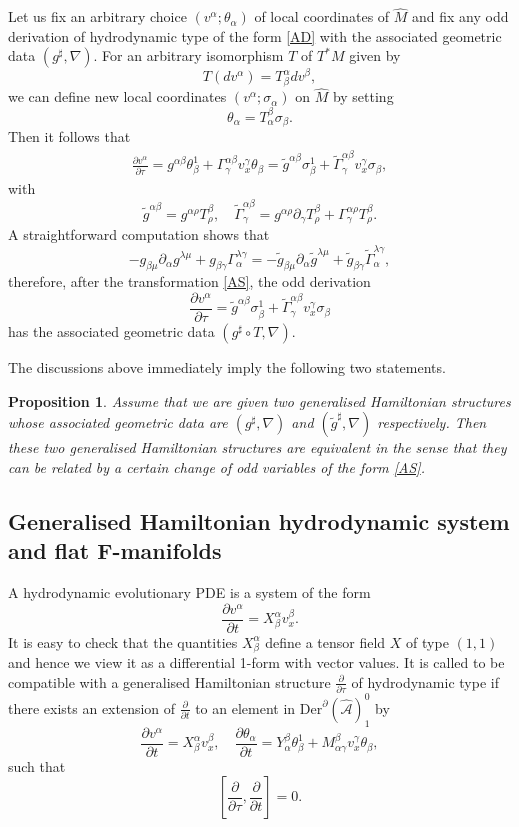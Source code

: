 \documentclass[11pt,a4paper]{amsart}
\numberwithin{equation}{section}
\newtheorem{proposition}[theorem]{Proposition}
\newcommand{\derx}{\mathrm{Der}^{\qp}(\hm A)}
\newcommand{\diff}[2]{\frac{\partial #1}{\partial #2}}
\newcommand{\qa}{\alpha}
\newcommand{\qb}{\beta}
\newcommand{\qg}{\gamma}
\newcommand{\qs}{\sigma}
\newcommand{\qt}{\tau}
\newcommand{\qth}{\theta}
\newcommand{\qp}{\partial}
\newcommand{\Qg}{\Gamma}
\newcommand{\ql}{\lambda}
\newcommand{\hm}[1]{\hat{\mathcal #1}}
\newcommand{\fk}[2]{\left[#1, #2\right]}
\numberwithin{equation}{section}
\begin{document}
Let us fix an arbitrary choice $(v^\qa;\qth_\qa)$ of local coordinates of $\hat M$ and fix any odd derivation of hydrodynamic type of the form \eqref{AD} with the associated geometric data $(g^\sharp,\nabla)$. For an arbitrary isomorphism $T$ of $T^*M$ given by 
\[
T(dv^\qa) = T^\qa_\qb dv^\qb,
\]
we can define new local coordinates $(v^\qa;\qs_\qa)$ on $\hat M$ by setting 
\begin{equation}
  \label{AS}
\qth_\qa = T_\qa^\qb\qs_\qb.
\end{equation}
Then it follows that 
\begin{align*}
  \diff{v^\qa}{\qt} = g^{\qa\qb}\qth_\qb^1+\Qg^{\qa\qb}_\qg v^\qg_x\qth_\qb=\tilde g^{\qa\qb}\qs_\qb^1+\tilde \Qg^{\qa\qb}_\qg v^\qg_x\qs_\qb,
\end{align*}
with
\[
\tilde g^{\qa\qb} = g^{\qa\rho}T^\qb_\rho,\quad \tilde\Qg^{\qa\qb}_\qg = g^{\qa\rho}\qp_\qg T^\qb_\rho+\Qg^{\qa\rho}_\qg T^\qb_\rho.
\]
A straightforward computation shows that 
\[
-g_{\qb\mu}\qp_\qa g^{\ql\mu}+g_{\qb\qg}\Qg^{\ql\qg}_\qa = -\tilde g_{\qb\mu}\qp_\qa \tilde g^{\ql\mu}+\tilde g_{\qb\qg}\tilde \Qg^{\ql\qg}_\qa,
\]
therefore, after the transformation \eqref{AS}, the odd derivation 
\[
\diff{v^\qa}{\qt}=\tilde g^{\qa\qb}\qs_\qb^1+\tilde \Qg^{\qa\qb}_\qg v^\qg_x\qs_\qb
\]
has the associated geometric data $(g^\sharp\circ T,\nabla)$. 

The discussions above immediately imply the following two statements.
\begin{proposition}
  \label{AW}
Assume that  we are given two generalised Hamiltonian structures whose associated geometric data are $(g^\sharp,\nabla)$ and $(\tilde g^\sharp,\nabla)$ respectively. Then these two generalised Hamiltonian structures are equivalent in the sense that they can be related by a certain change of odd variables of the form \eqref{AS}.
\end{proposition}


\subsection{Generalised Hamiltonian hydrodynamic system and flat F-manifolds}
A hydrodynamic evolutionary PDE is a system of the form 
\begin{equation}  \label{AJ}
\diff{v^\qa}{t} = X^\qa_\qb v_x^\qb.
\end{equation}
It is easy to check that the quantities $X^\qa_\qb$ define a tensor field $X$ of type $(1,1)$ and hence we view it as a differential 1-form with vector values. It is called to be compatible with a generalised Hamiltonian structure $\diff{}{\qt}$ of hydrodynamic type if there exists  an extension of $\diff{}{t}$ to an element in $\derx^0_1$ by  
\begin{equation}
  \label{AV}
\diff{v^\qa}{t} = X^\qa_\qb v_x^\qb,\quad \diff{\qth_\qa}{t} = Y^\qb_\qa\qth_\qb^1+M^\qb_{\qa\qg}v^\qg_x\qth_\qb,
\end{equation}
such that 
\[
\fk{\diff{}{\qt}}{\diff{}{t}} = 0.
\]
\end{document}
